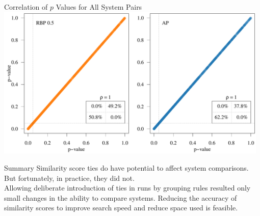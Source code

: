 \documentclass{beamer}
\begin{document}
\begin{frame}{Correlation of $p$ Values for All System Pairs}
\includegraphics[width=0.98\textwidth, page=11]{figs/p_scatter_for_talk.pdf}
\end{frame}

\begin{frame}{Summary}
Similarity score {\color{blue}ties} do have {\color{blue}potential} to affect system comparisons. But fortunately, {\color{blue}in practice}, they {\color{blue}did not}.\\[1.5em]

Allowing {\color{blue}deliberate introduction} of {\color{blue}ties} in runs by grouping rules resulted only {\color{blue}small changes} in the ability to {\color{blue}compare systems}. Reducing the accuracy of similarity scores to improve search speed and reduce space used is feasible.


\end{frame}

\end{document}
